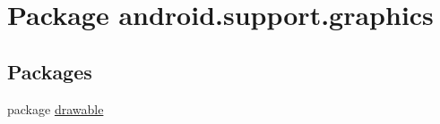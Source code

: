 \hypertarget{namespaceandroid_1_1support_1_1graphics}{
\section{Package android.support.graphics}
\label{namespaceandroid_1_1support_1_1graphics}
}
\subsection*{Packages}
\begin{CompactItemize}
\item 
package \hyperlink{namespaceandroid_1_1support_1_1graphics_1_1drawable}{drawable}
\end{CompactItemize}
